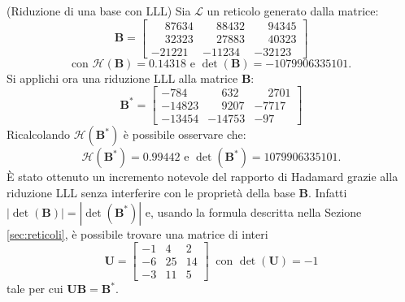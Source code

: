 \begin{exmp} (Riduzione di una base con LLL)
    Sia $\mathcal{L}$ un reticolo generato dalla matrice:
    \begin{equation*}
        \mathbf{B} =
        \begin{bmatrix*}
            \phantom{-}87634 & \phantom{-}88432 & \phantom{-}94345\\
            \phantom{-}32323 & \phantom{-}27883 & \phantom{-}40323\\
            -21221           & -11234           & -32123
        \end{bmatrix*}
    \end{equation*}
    \[
        \text{con } \mathcal{H}(\mathbf{B}) = 0.14318 \text{ e } \det(\mathbf{B}) = -1079906335101.
    \]
    Si applichi ora una riduzione LLL alla matrice $\mathbf{B}$:
    \begin{equation*}
        \mathbf{B}^* =
        \begin{bmatrix*}
            -784 & \phantom{-}632  & \phantom{-}2701\\
            -14823 & \phantom{-}9207          & -7717\\
            -13454 & -14753 & -97
        \end{bmatrix*}
    \end{equation*}
    Ricalcolando $\mathcal{H}(\mathbf{B}^*)$ è possibile osservare che:
    \[
        \mathcal{H}(\mathbf{B}^*) = 0.99442 \text{ e }\det(\mathbf{B}^*) = 1079906335101.
    \]
    È stato ottenuto un incremento notevole del rapporto di Hadamard grazie alla riduzione LLL senza 
    interferire con le proprietà della base $\mathbf{B}$. Infatti $|\det(\mathbf{B})| = |\det(\mathbf{B}^*)|$ e,
    usando la formula descritta nella Sezione \ref{sec:reticoli}, 
    è possibile trovare una matrice di interi
    \begin{equation*}
        \mathbf{U} =
        \begin{bmatrix*}
            -1 & 4 & 2\\
            -6 & 25 & 14\\
            -3 & 11 & 5
        \end{bmatrix*}
        \ \text{ con } \det(\mathbf{U}) = -1
    \end{equation*}
    tale per cui $\mathbf{U}\mathbf{B} = \mathbf{B}^*$.
\end{exmp}

